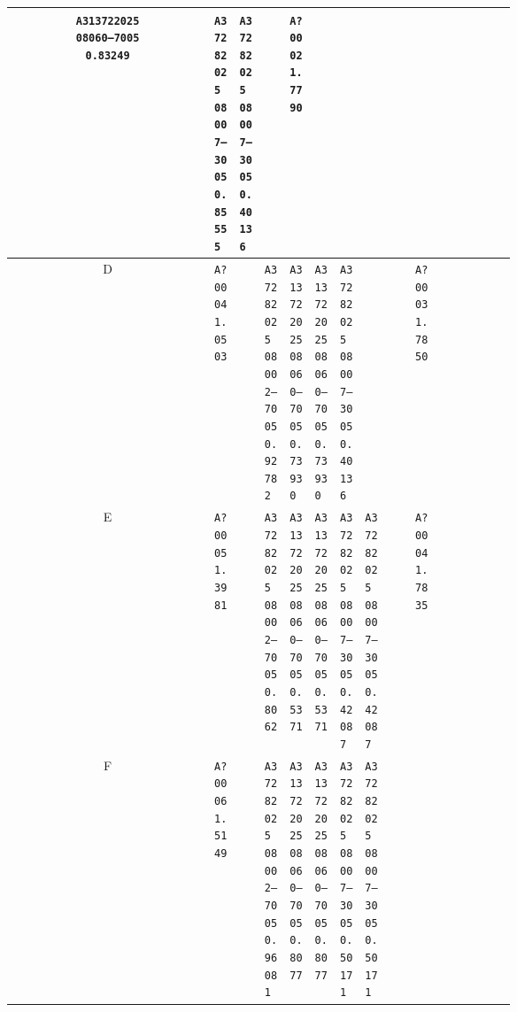 \documentclass[UTF8,10pt,a4paper,fontset=fandol]{ctexart}
\begin{document}
\begin{center}
\begin{tabular}{c|*{12}{p{0.055\linewidth}|}}
\texttt{A313722025\\08060--7005\\0.83249} &
\texttt{A37282025\\08007--3005\\0.85555} &
\texttt{A37282025\\08007--3005\\0.40136} &
 &
\texttt{A?0002\\1.7790} &
 &
 &
\\ \hline
D &
\texttt{A?0004\\1.0503} &
 &
\texttt{A37282025\\08002--7005\\0.92782} &
\texttt{A313722025\\08060--7005\\0.73930} &
\texttt{A313722025\\08060--7005\\0.73930} &
\texttt{A37282025\\08007--3005\\0.40136} &
 &
 &
\texttt{A?0003\\1.7850} &
 &
 &
\\ \hline
E &
\texttt{A?0005\\1.3981} &
 &
\texttt{A37282025\\08002--7005\\0.8062} &
\texttt{A313722025\\08060--7005\\0.5371} &
\texttt{A313722025\\08060--7005\\0.5371} &
\texttt{A37282025\\08007--3005\\0.42087} &
\texttt{A37282025\\08007--3005\\0.42087} &
 &
\texttt{A?0004\\1.7835} &
 &
 &
\\ \hline
F &
\texttt{A?0006\\1.5149} &
 &
\texttt{A37282025\\08002--7005\\0.96081} &
\texttt{A313722025\\08060--7005\\0.8077} &
\texttt{A313722025\\08060--7005\\0.8077} &
\texttt{A37282025\\08007--3005\\0.50171} &
\texttt{A37282025\\08007--3005\\0.50171} &

\end{tabular}
\end{center}
\end{document}
